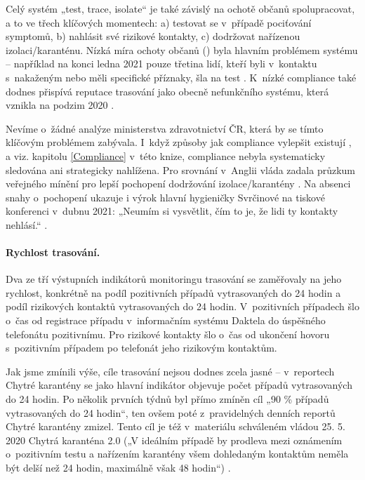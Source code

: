 Celý systém „test, trace, isolate“ je také závislý na ochotě občanů spolupracovat, a to ve třech klíčových momentech: a) testovat se v~případě pociťování symptomů, b) nahlásit své rizikové kontakty, c) dodržovat nařízenou izolaci/karanténu. Nízká míra ochoty občanů () byla hlavním problémem systému -- například na konci ledna 2021 pouze třetina lidí, kteří byli v~kontaktu s~nakaženým nebo měli specifické příznaky, šla na test \cite{tr_PAQ02}. K~nízké compliance také dodnes přispívá reputace trasování jako obecně nefunkčního systému, která vznikla na podzim 2020 \cite{tr_bisop01}.

Nevíme o~žádné analýze ministerstva zdravotnictví ČR, která by se tímto klíčovým problémem zabývala. I~když způsoby jak compliance vylepšit existují \cite{tr_bisop02}, a viz. kapitolu \ref{Compliance} v~této knize, compliance nebyla systematicky sledována ani strategicky nahlížena. Pro srovnání v~Anglii vláda zadala průzkum veřejného mínění pro lepší pochopení dodržování izolace/karantény \cite{tr_ofns}. Na absenci snahy o~pochopení ukazuje i výrok hlavní hygieničky Svrčinové na tiskové konferenci v~dubnu 2021: „Neumím si vysvětlit, čím to je, že lidi ty kontakty nehlásí.“ \cite{tr_idnes01}.


\paragraph{Rychlost trasování.} Dva ze tří výstupních indikátorů monitoringu trasování se zaměřovaly na jeho rychlost, konkrétně na podíl pozitivních případů vytrasovaných do 24 hodin a podíl rizikových kontaktů vytrasovaných do 24 hodin. V~pozitivních případech šlo o~čas od registrace případu v~informačním systému Daktela do úspěšného telefonátu pozitivnímu. Pro rizikové kontakty šlo o~čas od ukončení hovoru s~pozitivním případem po telefonát jeho rizikovým kontaktům.

Jak jsme zmínili výše, cíle trasování nejsou dodnes zcela jasné -- v~reportech Chytré karantény se jako hlavní indikátor objevuje počet případů vytrasovaných do 24 hodin. Po několik prvních týdnů byl přímo zmíněn cíl „90 \% případů vytrasovaných do 24 hodin“, ten ovšem poté z~pravidelných denních reportů Chytré karantény zmizel. Tento cíl je též v~materiálu schváleném vládou 25. 5. 2020 Chytrá karanténa 2.0 („V ideálním případě by prodleva mezi oznámením o~pozitivním testu a nařízením karantény všem dohledaným kontaktům neměla být delší než 24 hodin, maximálně však 48 hodin“) \cite{tr_vlada01}.



